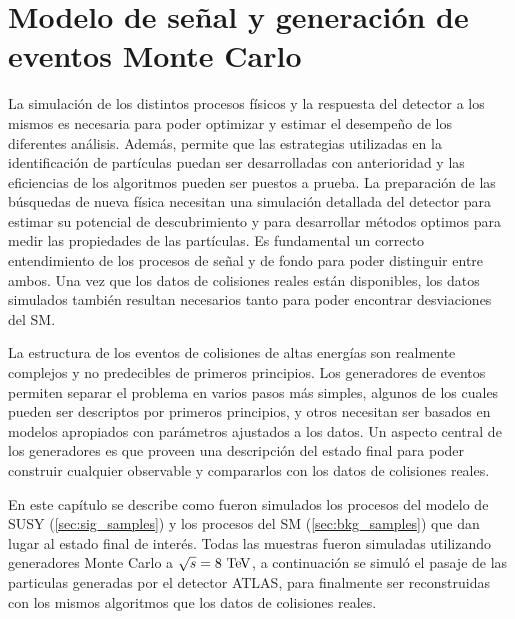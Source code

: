 \chapter{Modelo de señal y generación de eventos Monte Carlo}
\label{cap:simulaciones}

La simulación de los distintos procesos físicos y la respuesta del detector a
los mismos es necesaria para poder optimizar y estimar el desempeño de los
diferentes análisis. Además, permite que las estrategias utilizadas en la
identificación de partículas puedan ser desarrolladas con anterioridad y las
eficiencias de los algoritmos pueden ser puestos a prueba. La preparación de las
búsquedas de nueva física necesitan una simulación detallada del detector para
estimar su potencial de descubrimiento y para desarrollar métodos optimos para medir las
propiedades de las partículas. Es fundamental un correcto entendimiento de los
procesos de señal y de fondo para poder distinguir entre ambos. Una vez que los
datos de colisiones reales están disponibles, los datos simulados también
resultan necesarios tanto para poder encontrar desviaciones del SM.

La estructura de los eventos de colisiones de altas energías son realmente
complejos y no predecibles de primeros principios. Los generadores de eventos
permiten separar el problema en varios pasos más simples, algunos de los cuales
pueden ser descriptos por primeros principios, y otros necesitan ser basados en
modelos apropiados con parámetros ajustados a los datos. Un aspecto central de
los generadores es que proveen una descripción del estado final para
poder construir cualquier observable y compararlos con los datos de colisiones
reales.

En este capítulo se describe como fueron simulados los procesos del modelo de
SUSY (\cref{sec:sig_samples}) y los procesos del SM (\cref{sec:bkg_samples}) que
dan lugar al estado final de interés. Todas las muestras fueron simuladas
utilizando generadores Monte Carlo a $\sqrt{s}=8\tev$, a continuación se simuló
el pasaje de las particulas generadas por el detector ATLAS, para finalmente ser
reconstruidas con los mismos algoritmos que los datos de colisiones reales.





